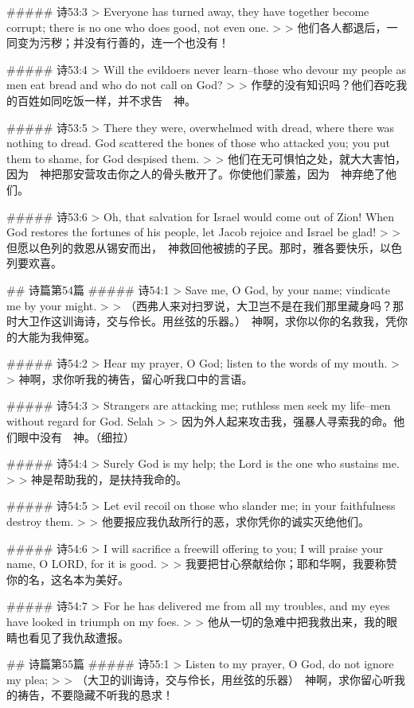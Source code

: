 ##### 诗53:3
> Everyone has turned away, they have together become corrupt; there is no one who does good, not even one.
>
> 他们各人都退后，一同变为污秽；并没有行善的，连一个也没有！


##### 诗53:4
> Will the evildoers never learn--those who devour my people as men eat bread and who do not call on God?
>
> 作孽的没有知识吗？他们吞吃我的百姓如同吃饭一样，并不求告　神。


##### 诗53:5
> There they were, overwhelmed with dread, where there was nothing to dread. God scattered the bones of those who attacked you; you put them to shame, for God despised them.
>
> 他们在无可惧怕之处，就大大害怕，因为　神把那安营攻击你之人的骨头散开了。你使他们蒙羞，因为　神弃绝了他们。


##### 诗53:6
> Oh, that salvation for Israel would come out of Zion! When God restores the fortunes of his people, let Jacob rejoice and Israel be glad!
>
> 但愿以色列的救恩从锡安而出，　神救回他被掳的子民。那时，雅各要快乐，以色列要欢喜。


## 诗篇第54篇
##### 诗54:1
> Save me, O God, by your name; vindicate me by your might.
>
> （西弗人来对扫罗说，大卫岂不是在我们那里藏身吗？那时大卫作这训诲诗，交与伶长。用丝弦的乐器。）　神啊，求你以你的名救我，凭你的大能为我伸冤。


##### 诗54:2
> Hear my prayer, O God; listen to the words of my mouth.
>
> 神啊，求你听我的祷告，留心听我口中的言语。


##### 诗54:3
> Strangers are attacking me; ruthless men seek my life--men without regard for God. Selah
>
> 因为外人起来攻击我，强暴人寻索我的命。他们眼中没有　神。（细拉）


##### 诗54:4
> Surely God is my help; the Lord is the one who sustains me.
>
> 神是帮助我的，是扶持我命的。


##### 诗54:5
> Let evil recoil on those who slander me; in your faithfulness destroy them.
>
> 他要报应我仇敌所行的恶，求你凭你的诚实灭绝他们。


##### 诗54:6
> I will sacrifice a freewill offering to you; I will praise your name, O LORD, for it is good.
>
> 我要把甘心祭献给你；耶和华啊，我要称赞你的名，这名本为美好。


##### 诗54:7
> For he has delivered me from all my troubles, and my eyes have looked in triumph on my foes.
>
> 他从一切的急难中把我救出来，我的眼睛也看见了我仇敌遭报。


## 诗篇第55篇
##### 诗55:1
> Listen to my prayer, O God, do not ignore my plea;
>
> （大卫的训诲诗，交与伶长，用丝弦的乐器）　神啊，求你留心听我的祷告，不要隐藏不听我的恳求！


